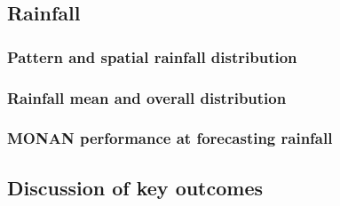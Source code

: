 
\subsection{Rainfall}

\subsubsection{Pattern and spatial rainfall distribution}

\subsubsection{Rainfall mean and overall distribution}

\subsubsection{MONAN performance at forecasting rainfall}

\subsection{Discussion of key outcomes}